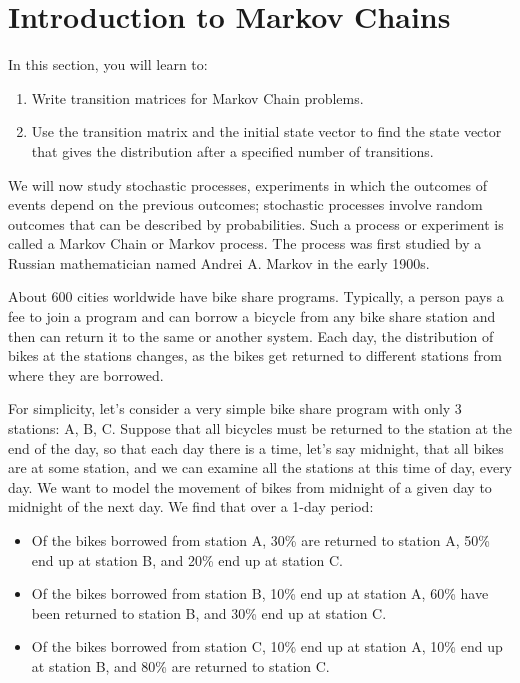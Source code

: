 \section{Introduction to Markov Chains}\label{section_markov_chains}

In this section, you will learn to:
\begin{enumerate}
    \item Write transition matrices for Markov Chain problems.
    \item Use the transition matrix and the initial state vector to find the state vector that gives the distribution after a specified number of transitions.
\end{enumerate}

We will now study stochastic processes, experiments in which the outcomes of events depend on the previous outcomes; stochastic processes involve random outcomes that can be described by probabilities. Such a process or experiment is called a Markov Chain or Markov process. The process was first studied by a Russian mathematician named Andrei A. Markov in the early 1900s.

About 600 cities worldwide have bike share programs. Typically, a person pays a fee to join a program and can borrow a bicycle from any bike share station and then can return it to the same or another system. Each day, the distribution of bikes at the stations changes, as the bikes get returned to different stations from where they are borrowed.

For simplicity, let’s consider a very simple bike share program with only 3 stations: A, B, C. Suppose that all bicycles must be returned to the station at the end of the day, so that each day there is a time, let’s say midnight, that all bikes are at some station, and we can examine all the stations at this time of day, every day. We want to model the movement of bikes from midnight of a given day to midnight of the next day. We find that over a 1-day period:

\begin{itemize}
    \item Of the bikes borrowed from station A, 30\% are returned to station A, 50\% end up at station B, and 20\% end up at station C.
    \item Of the bikes borrowed from station B, 10\% end up at station A, 60\% have been returned to station B, and 30\% end up at station C.
    \item Of the bikes borrowed from station C, 10\% end up at station A, 10\% end up at station B, and 80\% are returned to station C.
\end{itemize}

